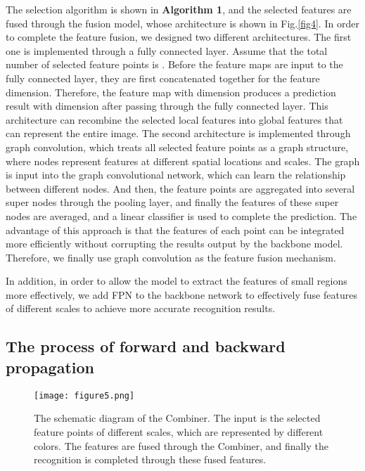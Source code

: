\documentclass[conference]{IEEEtran}
\begin{document}
The selection algorithm is shown in \textbf{Algorithm 1}, and the selected features are fused through the fusion model, whose architecture is shown in Fig.\ref{fig4}. In order to complete the feature fusion, we designed two different architectures. The first one is implemented through a fully connected layer. Assume that the total number of selected feature points is . Before the feature maps are input to the fully connected layer, they are first concatenated together for the feature dimension. Therefore, the feature map with dimension   produces a prediction result with dimension  after passing through the fully connected layer. This architecture can recombine the selected local features into global features that can represent the entire image. The second architecture is implemented through graph convolution, which treats all selected feature points as a graph structure, where nodes represent features at different spatial locations and scales. The graph is input into the graph convolutional network, which can learn the relationship between different nodes. And then, the feature points are aggregated into several super nodes through the pooling layer, and finally the features of these super nodes are averaged, and a linear classifier is used to complete the prediction. The advantage of this approach is that the features of each point can be integrated more efficiently without corrupting the results output by the backbone model. Therefore, we finally use graph convolution as the feature fusion mechanism.

In addition, in order to allow the model to extract the features of small regions more effectively, we add FPN to the backbone network to effectively fuse features of different scales to achieve more accurate recognition results.


\subsection{The process of forward and backward propagation}

\begin{figure}[!tp]
\centerline{\texttt{[image: figure5.png]}}
\caption{The schematic diagram of the Combiner. The input is the selected feature points of different scales, which are represented by different colors. The features are fused through the Combiner, and finally the recognition is completed through these fused features.}
\label{fig5}
\end{figure}
\end{document}

